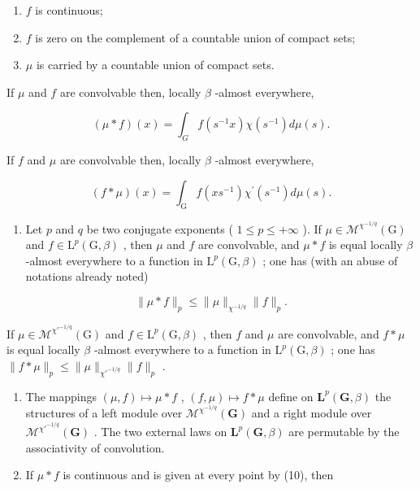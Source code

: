 \begin{enumerate}
\def\labelenumi{(\roman{enumi})}
\item
  \(f\) is continuous;
\item
  \(f\) is zero on the complement of a countable union of compact sets;
\item
  \(\mu\) is carried by a countable union of compact sets.
\end{enumerate}

If \(\mu\) and \(f\) are convolvable then, locally \(\beta\) -almost everywhere,

\[
(\mu * f) (x) = \int_ {G} f (s ^ {- 1} x) \chi (s ^ {- 1}) d \mu (s).\tag{10}
\]

If \(f\) and \(\mu\) are convolvable then, locally \(\beta\) -almost everywhere,

\[
(f * \mu) (x) = \int_ {\mathrm{G}} f (x s ^ {- 1}) \chi^ {\prime} (s ^ {- 1}) d \mu (s).\tag{11}
\]

\begin{enumerate}
\def\labelenumi{\arabic{enumi})}
\setcounter{enumi}{1}
\tightlist
\item
  Let \(p\) and \(q\) be two conjugate exponents ( \(1 \leqslant p \leqslant +\infty\) ). If \(\mu \in \mathcal{M}^{\chi^{-1/q}}(\mathrm{G})\) and \(f \in \mathrm{L}^p(\mathrm{G},\beta)\) , then \(\mu\) and \(f\) are convolvable, and \(\mu * f\) is equal locally \(\beta\) -almost everywhere to a function in \(\mathrm{L}^p(\mathrm{G},\beta)\) ; one has (with an abuse of notations already noted)
\end{enumerate}

\[
\| \mu * f \| _ {p} \leqslant \| \mu \| _ {\chi^ {- 1 / q}} \| f \| _ {p}.
\]

If \(\mu \in \mathcal{M}^{\chi'^{-1/q}}(\mathrm{G})\) and \(f \in \mathrm{L}^p(\mathrm{G},\beta)\) , then \(f\) and \(\mu\) are convolvable, and \(f * \mu\) is equal locally \(\beta\) -almost everywhere to a function in \(\mathrm{L}^p(\mathrm{G},\beta)\) ; one has \(\| f * \mu \|_p \leqslant \| \mu \|_{\chi'^{-1/q}} \| f \|_p\) .

\begin{enumerate}
\def\labelenumi{\arabic{enumi})}
\setcounter{enumi}{2}
\item
  The mappings \((\mu, f) \mapsto \mu * f\) , \((f, \mu) \mapsto f * \mu\) define on \(\mathbf{L}^p(\mathbf{G}, \beta)\) the structures of a left module over \(\mathcal{M}^{\chi^{-1/q}}(\mathbf{G})\) and a right module over \(\mathcal{M}^{\chi'^{-1/q}}(\mathbf{G})\) . The two external laws on \(\mathbf{L}^p(\mathbf{G}, \beta)\) are permutable by the associativity of convolution.
\item
  If \(\mu * f\) is continuous and is given at every point by (10), then
\end{enumerate}

